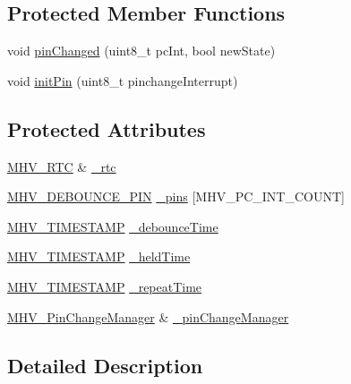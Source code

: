\subsection*{\-Protected \-Member \-Functions}
\begin{DoxyCompactItemize}
\item 
void \hyperlink{class_m_h_v___debounce_abe77ae67fb3b94307edf52ddeaf768da}{pin\-Changed} (uint8\-\_\-t pc\-Int, bool new\-State)
\item 
void \hyperlink{class_m_h_v___debounce_ab5cc2cbf8e925708f01d2b7d1b4a2939}{init\-Pin} (uint8\-\_\-t pinchange\-Interrupt)
\end{DoxyCompactItemize}
\subsection*{\-Protected \-Attributes}
\begin{DoxyCompactItemize}
\item 
\hyperlink{class_m_h_v___r_t_c}{\-M\-H\-V\-\_\-\-R\-T\-C} \& \hyperlink{class_m_h_v___debounce_a5594f588099ccfcff2b3b23b503e8f6d}{\-\_\-rtc}
\item 
\hyperlink{_m_h_v___debounce_8h_a1e51966b7fb269bd10a163734aa1ddfb}{\-M\-H\-V\-\_\-\-D\-E\-B\-O\-U\-N\-C\-E\-\_\-\-P\-I\-N} \hyperlink{class_m_h_v___debounce_a5cf65bfecfc0efd4d51e1506972d2796}{\-\_\-pins} \mbox{[}\-M\-H\-V\-\_\-\-P\-C\-\_\-\-I\-N\-T\-\_\-\-C\-O\-U\-N\-T\mbox{]}
\item 
\hyperlink{_m_h_v___r_t_c_8h_a1e30d3a92b1b868286bd0d619245d8a6}{\-M\-H\-V\-\_\-\-T\-I\-M\-E\-S\-T\-A\-M\-P} \hyperlink{class_m_h_v___debounce_ac3d3f83d43cbb2c7b4b74244c75d593a}{\-\_\-debounce\-Time}
\item 
\hyperlink{_m_h_v___r_t_c_8h_a1e30d3a92b1b868286bd0d619245d8a6}{\-M\-H\-V\-\_\-\-T\-I\-M\-E\-S\-T\-A\-M\-P} \hyperlink{class_m_h_v___debounce_a051a7a07c755f52f4444075ff897ac82}{\-\_\-held\-Time}
\item 
\hyperlink{_m_h_v___r_t_c_8h_a1e30d3a92b1b868286bd0d619245d8a6}{\-M\-H\-V\-\_\-\-T\-I\-M\-E\-S\-T\-A\-M\-P} \hyperlink{class_m_h_v___debounce_a422167777e3bfcf6b7b46b992058950f}{\-\_\-repeat\-Time}
\item 
\hyperlink{class_m_h_v___pin_change_manager}{\-M\-H\-V\-\_\-\-Pin\-Change\-Manager} \& \hyperlink{class_m_h_v___debounce_a85d99fc351fbd791a4effe8bd8f76f6f}{\-\_\-pin\-Change\-Manager}
\end{DoxyCompactItemize}


\subsection{\-Detailed \-Description}


